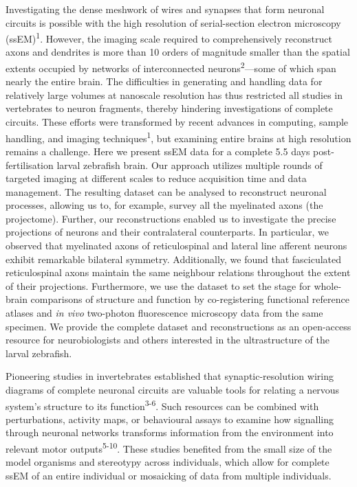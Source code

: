 \documentclass{article}
\begin{document}
Investigating the dense meshwork of wires and synapses that form neuronal circuits is possible with the high resolution of serial-section electron microscopy (ssEM)\textsuperscript{1}. However, the imaging scale required to comprehensively reconstruct axons and dendrites is more than 10 orders of magnitude smaller than the spatial extents occupied by networks of interconnected neurons\textsuperscript{2}—some of which span nearly the entire brain. The difficulties in generating and handling data for relatively large volumes at nanoscale resolution has thus restricted all studies in vertebrates to neuron fragments, thereby hindering investigations of complete circuits. These efforts were transformed by recent advances in computing, sample handling, and imaging techniques\textsuperscript{1}, but examining entire brains at high resolution remains a challenge. Here we present ssEM data for a complete 5.5 days post-fertilisation larval zebrafish brain. Our approach utilizes multiple rounds of targeted imaging at different scales to reduce acquisition time and data management. The resulting dataset can be analysed to reconstruct neuronal processes, allowing us to, for example, survey all the myelinated axons (the projectome). Further, our reconstructions enabled us to investigate the precise projections of neurons and their contralateral counterparts. In particular, we observed that myelinated axons of reticulospinal and lateral line afferent neurons exhibit remarkable bilateral symmetry. Additionally, we found that fasciculated reticulospinal axons maintain the same neighbour relations throughout the extent of their projections. Furthermore, we use the dataset to set the stage for whole-brain comparisons of structure and function by co-registering functional reference atlases and \textit{in vivo} two-photon fluorescence microscopy data from the same specimen. We provide the complete dataset and reconstructions as an open-access resource for neurobiologists and others interested in the ultrastructure of the larval zebrafish.

Pioneering studies in invertebrates established that synaptic-resolution wiring diagrams of complete neuronal circuits are valuable tools for relating a nervous system’s structure to its function\textsuperscript{3-6}. Such resources can be combined with perturbations, activity maps, or behavioural assays to examine how signalling through neuronal networks transforms information from the environment into relevant motor outputs\textsuperscript{5-10}. These studies benefited from the small size of the model organisms and stereotypy across individuals, which allow for complete ssEM of an entire individual or mosaicking of data from multiple individuals.
\end{document}
